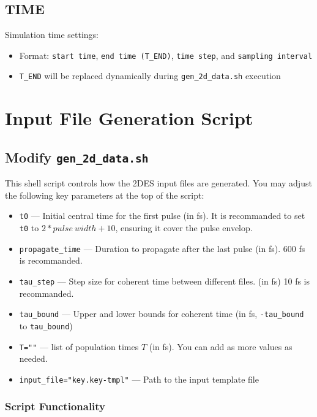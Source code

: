 \documentclass{article}
\begin{document}
\subsection*{TIME}
Simulation time settings:
\begin{itemize}
    \item Format: \texttt{start time}, \texttt{end time (T\_END)}, \texttt{time step}, and \texttt{sampling interval}
    \item \texttt{T\_END} will be replaced dynamically during \texttt{gen\_2d\_data.sh} execution
\end{itemize}

\newpage

\section{Input File Generation Script}

\subsection*{Modify \texttt{gen\_2d\_data.sh}}

This shell script controls how the 2DES input files are generated. You may adjust the following key parameters at the top of the script:

\begin{itemize}
    \item \texttt{t0} — Initial central time for the first pulse (in fs). It is recommanded to set \texttt{t0} to $2 * pulse\ width + 10$, ensuring it cover the pulse envelop.
    \item \texttt{propagate\_time} — Duration to propagate after the last pulse (in fs). 600 fs is recommanded.
    \item \texttt{tau\_step} — Step size for coherent time between different files. (in fs) 10 fs is recommanded.
    \item \texttt{tau\_bound} — Upper and lower bounds for coherent time (in fs, \texttt{-tau\_bound} to \texttt{tau\_bound})
    \item \texttt{T=""} — list of population times \(T\) (in fs). You can add as more values as needed.
    \item \texttt{input\_file="key.key-tmpl"} — Path to the input template file
\end{itemize}

\subsubsection*{Script Functionality}
\end{document}
